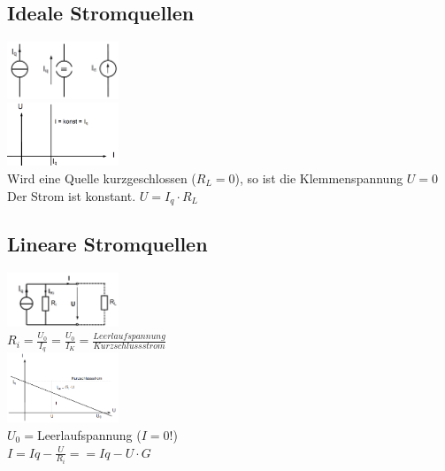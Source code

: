 \subsection{Ideale Stromquellen}
\begin{multicols}{4}
\includegraphics[width=0.25\textwidth]{pics/quellen/IQsymbole}\\
\includegraphics[width=0.25\textwidth]{pics/quellen/QIkennlinie}\\
Wird eine Quelle kurzgeschlossen ($R_L = 0$), so ist die Klemmenspannung $U=0$\\
Der Strom ist konstant. $U = I_{q} \cdot R_{L}$
\end{multicols}

\subsection{Lineare Stromquellen}
\begin{multicols}{4}
\includegraphics[width=0.25\textwidth]{pics/quellen/lIEquellen}\\
$R_i=\frac{U_0}{I_q}=\frac{U_0}{I_K}=\frac{Leerlaufspannung}{Kurzschlussstrom}$\\
\includegraphics[width=0.25\textwidth]{pics/quellen/IUkennlinie}\\
$U_0=$Leerlaufspannung ($I=0!$)\\
$I = I{q} - \frac{U}{R_{i}} =  = I{q} - U \cdot G  $
\end{multicols}

